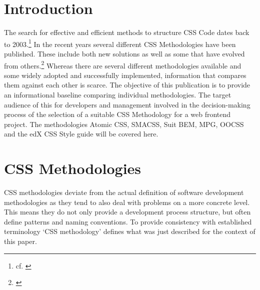 \chapter{Introduction}
The search for effective and efficient methods to structure CSS Code dates back to 2003.\footnote{cf. \cite{methodmails}}
In the recent years several different CSS Methodologies have been published.
These include both new solutions as well as some that have evolved from others.\footnote{\cite{methodologyoverview}}
Whereas there are several different methodologies available and some widely adopted and successfully implemented, information that compares them against each other is scarce.
The objective of this publication is to provide an informational baseline comparing individual methodologies.
The target audience of this for developers and management involved in the decision-making process of the selection of a suitable CSS Methodology for a web frontend project.
The methodologies Atomic CSS, SMACSS, Suit BEM, MPG, OOCSS and the edX CSS Style guide will be covered here.





\chapter{CSS Methodologies}
CSS methodologies deviate from the actual definition of software development methodologies as they tend to also deal with problems on a more concrete level.
This means they do not only provide a development process structure, but often define patterns and naming conventions.
To provide consistency with established terminology `CSS methodology' defines what was just described for the context of this paper.

